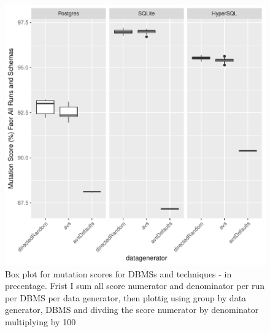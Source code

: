 \documentclass[runningheads,a4paper]{llncs}
\begin{document}
\begin{figure}[htbp]
\centering
\includegraphics{../plots/figure7.pdf}
\caption{Box plot for mutation scores for DBMSs and techniques - in
precentage. Frist I sum all score numerator and denominator per run per
DBMS per data generator, then plottig using group by data generator,
DBMS and divding the score numerator by denominator multiplying by 100}
\end{figure}
\end{document}
